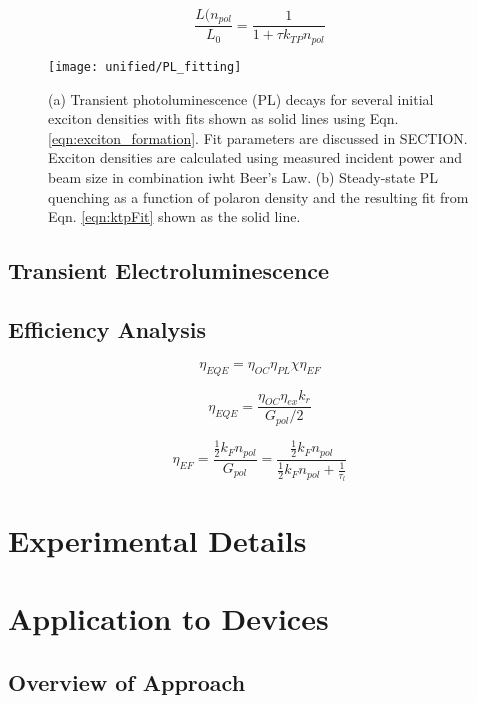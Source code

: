 \documentclass[../thesis.tex]{subfiles}
\begin{document}
\begin{equation}
\frac{L(n_{pol}}{L_0}=\frac{1}{1+\tau k_{TP}n_{pol}}
\label{eqn:ktpFit}
\end{equation}




\begin{wrapfigure}{r}{0.5\textwidth}
\centering
\texttt{[image: unified/PL\_fitting]}
\caption{(a) Transient photoluminescence (PL) decays for several initial exciton densities with fits shown as solid lines using Eqn. \ref{eqn:exciton_formation}.  Fit parameters are discussed in SECTION.  Exciton densities are calculated using measured incident power and beam size in combination iwht Beer's Law.  (b) Steady-state PL quenching as a function of polaron density and the resulting fit from Eqn. \ref{eqn:ktpFit} shown as the solid line.}
\label{fig:PL_fitting}
\end{wrapfigure}
\subsection{Transient Electroluminescence}
\subsection{Efficiency Analysis}

\begin{equation}
\eta_{EQE}=\eta_{OC}\eta_{PL}\chi\eta_{EF}
\label{eqn:eqeSimple}
\end{equation}

\begin{equation}
\eta_{EQE}=\frac{\eta_{OC}\eta_{ex}k_r}{G_{pol}/2}
\label{eqn:eqeReform}
\end{equation}

\begin{equation}
\eta_{EF}=\frac{\frac{1}{2}k_Fn_{pol}}{G_{pol}}=\frac{\frac{1}{2}k_Fn_{pol}}{\frac{1}{2}k_Fn_{pol}+\frac{1}{\tau_l}}
\label{eqn:excitonFormation}
\end{equation}

\section{Experimental Details}
\section{Application to Devices}
\subsection{Overview of Approach}
\end{document}
